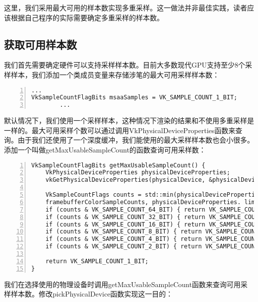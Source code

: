 \documentclass{ctexart}
\begin{document}
这里，我们采用最大可用的样本数实现多重采样。这一做法并非最佳实践，读者应该根据自己程序的实际需要确定多重采样的样本数。

\subsection{获取可用样本数}

我们首先需要确定硬件可以支持采样样本数。目前大多数现代GPU支持至少8个采样样本，我们添加一个类成员变量来存储涉笔的最大可用采样样本数：

\begin{lstlisting}[language={[ANSI]C},keywordstyle=\color{blue!70},commentstyle=\color{red!50!green!50!blue!50},frame=shadowbox, rulesepcolor=\color{red!20!green!20!blue!20},basicstyle=\small,numbers=left, numberstyle=\tiny,breaklines=true]
		...
VkSampleCountFlagBits msaaSamples = VK_SAMPLE_COUNT_1_BIT;
		...
\end{lstlisting}

默认情况下，我们使用一个采样样本，这种情况下渲染的结果和不使用多重采样是一样的。最大可用采样个数可以通过调用VkPhysicalDeviceProperties函数来查询。由于我们还使用了一个深度缓冲，我们能使用的最大采样样本数也会小很多。添加一个叫做getMaxUsableSampleCount的函数查询可用采样数：

\begin{lstlisting}[language={[ANSI]C},keywordstyle=\color{blue!70},commentstyle=\color{red!50!green!50!blue!50},frame=shadowbox, rulesepcolor=\color{red!20!green!20!blue!20},basicstyle=\small,numbers=left, numberstyle=\tiny,breaklines=true]
VkSampleCountFlagBits getMaxUsableSampleCount() {
	VkPhysicalDeviceProperties physicalDeviceProperties;
	vkGetPhysicalDeviceProperties(physicalDevice, &physicalDeviceProperties);

	VkSampleCountFlags counts = std::min(physicalDeviceProperties.limits.
	framebufferColorSampleCounts, physicalDeviceProperties. limits.framebufferDepthSampleCounts);
	if (counts & VK_SAMPLE_COUNT_64_BIT) { return VK_SAMPLE_COUNT_64_BIT; }
	if (counts & VK_SAMPLE_COUNT_32_BIT) { return VK_SAMPLE_COUNT_32_BIT; }
	if (counts & VK_SAMPLE_COUNT_16_BIT) { return VK_SAMPLE_COUNT_16_BIT; }
	if (counts & VK_SAMPLE_COUNT_8_BIT) { return VK_SAMPLE_COUNT_8_BIT; }
	if (counts & VK_SAMPLE_COUNT_4_BIT) { return VK_SAMPLE_COUNT_4_BIT; }
	if (counts & VK_SAMPLE_COUNT_2_BIT) { return VK_SAMPLE_COUNT_2_BIT; }

	return VK_SAMPLE_COUNT_1_BIT;
}
\end{lstlisting}

我们在选择使用的物理设备时调用getMaxUsableSampleCount函数来查询可用采样样本数。修改pickPhysicalDevice函数实现这一目的：
\end{document}
